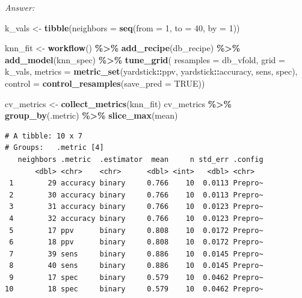\documentclass[
]{book}
\newenvironment{Shaded}{\begin{snugshade}}{\end{snugshade}}
\newcommand{\AttributeTok}[1]{\textcolor[rgb]{0.13,0.29,0.53}{#1}}
\newcommand{\ConstantTok}[1]{\textcolor[rgb]{0.56,0.35,0.01}{#1}}
\newcommand{\DecValTok}[1]{\textcolor[rgb]{0.00,0.00,0.81}{#1}}
\newcommand{\FunctionTok}[1]{\textcolor[rgb]{0.13,0.29,0.53}{\textbf{#1}}}
\newcommand{\NormalTok}[1]{#1}
\newcommand{\OtherTok}[1]{\textcolor[rgb]{0.56,0.35,0.01}{#1}}
\newcommand{\SpecialCharTok}[1]{\textcolor[rgb]{0.81,0.36,0.00}{\textbf{#1}}}
\begin{document}
\emph{Answer:}

\begin{Shaded}
\begin{Highlighting}[]
\NormalTok{k\_vals }\OtherTok{\textless{}{-}} \FunctionTok{tibble}\NormalTok{(}\AttributeTok{neighbors =} \FunctionTok{seq}\NormalTok{(}\AttributeTok{from =} \DecValTok{1}\NormalTok{, }\AttributeTok{to =} \DecValTok{40}\NormalTok{, }\AttributeTok{by =} \DecValTok{1}\NormalTok{))}
\end{Highlighting}
\end{Shaded}

\begin{Shaded}
\begin{Highlighting}[]
\NormalTok{knn\_fit }\OtherTok{\textless{}{-}} \FunctionTok{workflow}\NormalTok{() }\SpecialCharTok{\%\textgreater{}\%}
  \FunctionTok{add\_recipe}\NormalTok{(db\_recipe) }\SpecialCharTok{\%\textgreater{}\%}
  \FunctionTok{add\_model}\NormalTok{(knn\_spec) }\SpecialCharTok{\%\textgreater{}\%}
  \FunctionTok{tune\_grid}\NormalTok{(}
    \AttributeTok{resamples =}\NormalTok{ db\_vfold, }
    \AttributeTok{grid =}\NormalTok{ k\_vals,}
    \AttributeTok{metrics =} \FunctionTok{metric\_set}\NormalTok{(yardstick}\SpecialCharTok{::}\NormalTok{ppv, yardstick}\SpecialCharTok{::}\NormalTok{accuracy, sens, spec),}
    \AttributeTok{control =} \FunctionTok{control\_resamples}\NormalTok{(}\AttributeTok{save\_pred =} \ConstantTok{TRUE}\NormalTok{))}
\end{Highlighting}
\end{Shaded}

\begin{Shaded}
\begin{Highlighting}[]
\NormalTok{cv\_metrics }\OtherTok{\textless{}{-}} \FunctionTok{collect\_metrics}\NormalTok{(knn\_fit) }
\NormalTok{cv\_metrics }\SpecialCharTok{\%\textgreater{}\%} \FunctionTok{group\_by}\NormalTok{(.metric) }\SpecialCharTok{\%\textgreater{}\%} \FunctionTok{slice\_max}\NormalTok{(mean) }
\end{Highlighting}
\end{Shaded}

\begin{verbatim}
# A tibble: 10 x 7
# Groups:   .metric [4]
   neighbors .metric  .estimator  mean     n std_err .config
       <dbl> <chr>    <chr>      <dbl> <int>   <dbl> <chr>  
 1        29 accuracy binary     0.766    10  0.0113 Prepro~
 2        30 accuracy binary     0.766    10  0.0113 Prepro~
 3        31 accuracy binary     0.766    10  0.0123 Prepro~
 4        32 accuracy binary     0.766    10  0.0123 Prepro~
 5        17 ppv      binary     0.808    10  0.0172 Prepro~
 6        18 ppv      binary     0.808    10  0.0172 Prepro~
 7        39 sens     binary     0.886    10  0.0145 Prepro~
 8        40 sens     binary     0.886    10  0.0145 Prepro~
 9        17 spec     binary     0.579    10  0.0462 Prepro~
10        18 spec     binary     0.579    10  0.0462 Prepro~
\end{verbatim}
\end{document}
